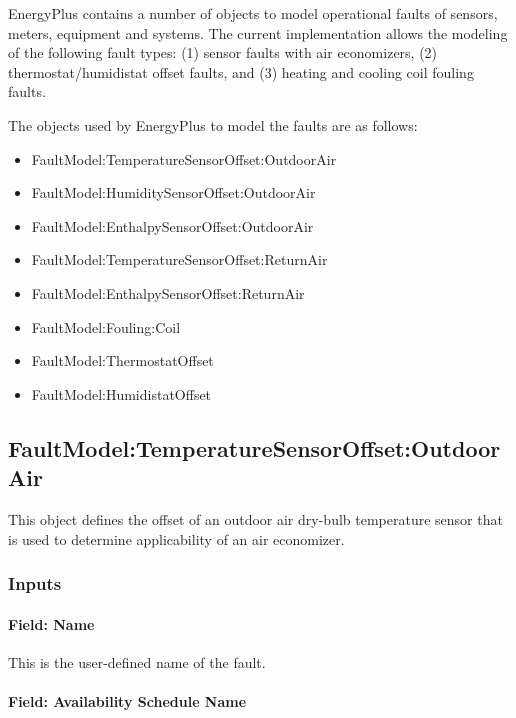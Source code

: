 EnergyPlus contains a number of objects to model operational faults of sensors, meters, equipment and systems. The current implementation allows the modeling of the following fault types: (1) sensor faults with air economizers, (2) thermostat/humidistat offset faults, and (3) heating and cooling coil fouling faults.

The objects used by EnergyPlus to model the faults are as follows:

\begin{itemize}
\item
  FaultModel:TemperatureSensorOffset:OutdoorAir
\item
  FaultModel:HumiditySensorOffset:OutdoorAir
\item
  FaultModel:EnthalpySensorOffset:OutdoorAir
\item
  FaultModel:TemperatureSensorOffset:ReturnAir
\item
  FaultModel:EnthalpySensorOffset:ReturnAir
\item
  FaultModel:Fouling:Coil
\item
  FaultModel:ThermostatOffset
\item
  FaultModel:HumidistatOffset
\end{itemize}

\subsection{FaultModel:TemperatureSensorOffset:OutdoorAir}\label{faultmodeltemperaturesensoroffsetoutdoorair}

This object defines the offset of an outdoor air dry-bulb temperature sensor that is used to determine applicability of an air economizer.

\subsubsection{Inputs}\label{inputs-029}

\paragraph{Field: Name}\label{field-name-028}

This is the user-defined name of the fault.

\paragraph{Field: Availability Schedule Name}\label{field-availability-schedule-name-011}

